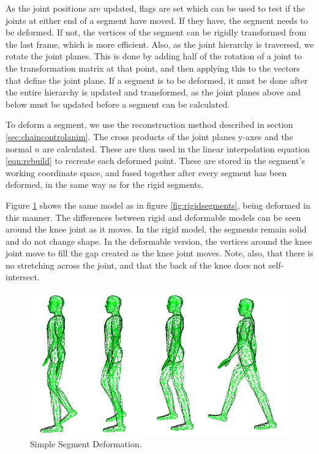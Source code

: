 \documentclass[10pt,oneside,fleqn,a4paper]{book}
\begin{document}
As the joint positions are updated, flags are set which can be used to test if the joints at either end of a segment have moved. If they have, the segment needs to be deformed. If not, the vertices of the segment can be rigidly transformed from the last frame, which is more efficient. Also, as the joint hierarchy is traversed, we rotate the joint planes. This is done by adding half of the rotation of a joint to the transformation matrix at that point, and then applying this to the vectors that define the joint plane. If a segment is to be deformed, it must be done after the entire hierarchy is updated and transformed, as the joint planes above and below must be updated before a segment can be calculated.

To deform a segment, we use the reconstruction method described in section \ref{sec:chaincontrolanim}. The cross products of the joint planes y-axes and the normal $n$ are calculated. These are then used in the linear interpolation equation \ref{eqn:rebuild} to recreate each deformed point. These are stored in the segment's working coordinate space, and fused together after every segment has been deformed, in the same way as for the rigid segments.

Figure \ref{fig:simplesegments} shows the same model as in figure \ref{fig:rigidsegments}, being deformed in this manner. The differences between rigid and deformable models can be seen around the knee joint as it moves. In the rigid model, the segments remain solid and do not change shape. In the deformable version, the vertices around the knee joint move to fill the gap created as the knee joint moves. Note, also, that there is no stretching across the joint, and that the back of the knee does not self-intersect.

\begin{figure}
\begin{center}
\includegraphics[width=14cm]{../images/simpleanimation}
\caption[Simple Segment Deformation]{\label{fig:simplesegments} Simple Segment Deformation.}
\end{center}
\end{figure}
\end{document}

